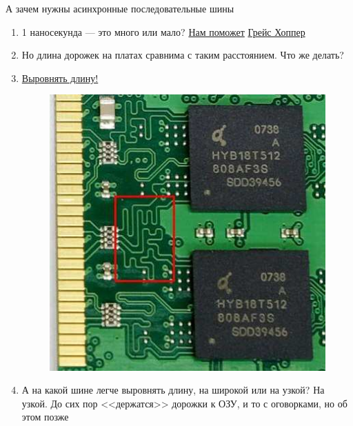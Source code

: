 \documentclass[xetex,aspectratio=43]{beamer}
\begin{document}
\begin{frame}{А зачем нужны асинхронные последовательные шины}
    \begin{enumerate}
        \item 1 наносекунда --- это много или мало? \href{https://youtu.be/gYqF6-h9Cvg}{Нам поможет} \href{https://en.wikipedia.org/wiki/Grace_Hopper}{Грейс Хоппер}
        \pause
        \item Но длина дорожек на платах сравнима с таким расстоянием. Что же делать?
        \pause
        \item \href{https://www.electromaker.io/blog/article/7-ways-to-quickly-judge-the-quality-of-your-printed-circuit-board-pcb-design}{Выровнять длину!}
        \begin{figure}
            \includegraphics[height=0.5\textheight]{img/03.length_equiv.jpg}
        \end{figure}
        \item А на какой шине легче выровнять длину, на широкой или на узкой? На узкой. До сих пор <<держатся>> дорожки к ОЗУ, и то с оговорками, но об этом позже
    \end{enumerate}
\end{frame}


\section*{}
\end{document}
